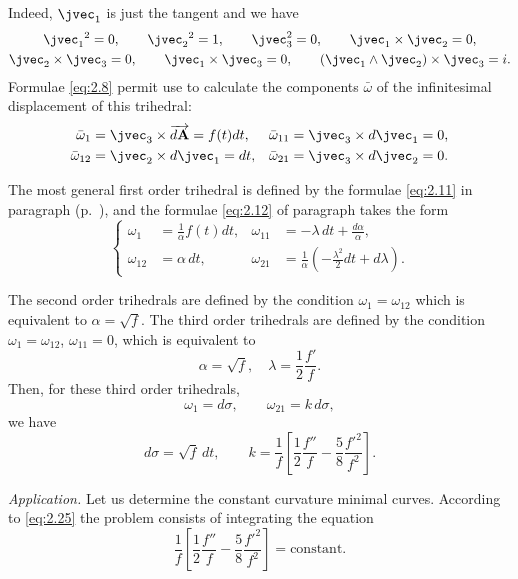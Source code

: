 Indeed, $\jvec_{1}$ is just the tangent and we have
\begin{gather*}
  \jvec_{1}{}^{2}=0,\qquad\jvec_{2}{}^{2}=1,\qquad\jvec_{3}^{2}=0,\qquad \jvec_{1}\times\jvec_{2}=0,\\
  \jvec_{2}\times\jvec_{3}=0,\qquad\jvec_{1}\times\jvec_{3}=0,\qquad(\jvec_{1}\wedge\jvec_{2})\times\jvec_{3}=i.
\end{gather*}
Formulae \eqref{eq:2.8} permit use to calculate the components $\bar\omega$ of the infinitesimal displacement of this trihedral:
\begin{align*}
  \bar\omega_{1}&=\jvec_{3}\times\overrightarrow{d\mathbf{A}}=f(t)dt,&\bar\omega_{11}&=\jvec_{3}\times d\jvec_{1}=0,\\
  \bar\omega_{12}&=\jvec_{2}\times d\jvec_{1}=dt,&\bar\omega_{21}&=\jvec_{3}\times d\jvec_{2}=0.
\end{align*}

The most general first order trihedral is defined by the formulae \eqref{eq:2.11} in paragraph  (p.~\pageref{eq:2.11}), and the formulae \eqref{eq:2.12} of paragraph  takes the form
\begin{equation}
  \label{eq:2.24}
  \left\{
    \begin{aligned}
      \omega_{1}&=\frac{1}{\alpha}f(t)dt,&\omega_{11}&=-\lambda\,dt+\frac{d\alpha}{\alpha},\\
      \omega_{12}&=\alpha\,dt,&\omega_{21}&=\frac{1}{\alpha}\left(-\frac{\lambda^{2}}{2}dt+d\lambda\right).
    \end{aligned}
  \right.
\end{equation}

The second order trihedrals are defined by the condition $\omega_{1}=\omega_{12}$ which is equivalent to $\alpha=\sqrt{f}$. The third order trihedrals are defined by the condition $\omega_{1}=\omega_{12}$, $\omega_{11}=0$, which is equivalent to
\[
\alpha=\sqrt{f},\quad\lambda=\frac{1}{2}\frac{f'}{f}.
\]
Then, for these third order trihedrals,
\[
\omega_{1}=d\sigma,\qquad\omega_{21}=k\,d\sigma,
\]
we have
\begin{equation}
  \label{eq:2.25}
  d\sigma=\sqrt{f}\,dt,\qquad k=\frac{1}{f}\left[\frac{1}{2}\frac{f''}{f}-\frac{5}{8}\frac{f'^{2}}{f^{2}}\right].
\end{equation}

\somespace

\emph{Application.} Let us determine the constant curvature minimal curves. According to \eqref{eq:2.25} the problem consists of integrating the equation
\[
\frac{1}{f}\left[\frac{1}{2}\frac{f''}{f}-\frac{5}{8}\frac{f'^{2}}{f^{2}}\right]=\text{constant.}
\]

